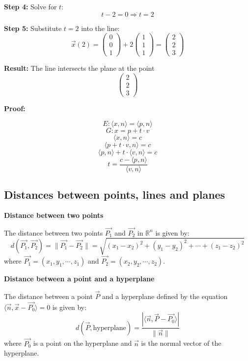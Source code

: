 \textbf{Step 4:} Solve for \( t \):
\[
	t - 2 = 0 \Rightarrow t = 2
\]

\textbf{Step 5:} Substitute \( t = 2 \) into the line:
\[
	\vec{x}(2) = \begin{pmatrix} 0 \\ 0 \\ 1 \end{pmatrix} + 2 \begin{pmatrix} 1 \\ 1 \\ 1 \end{pmatrix} =
	\begin{pmatrix} 2 \\ 2 \\ 3 \end{pmatrix}
\]

\textbf{Result:} The line intersects the plane at the point
\[
	\boxed{\begin{pmatrix} 2 \\ 2 \\ 3 \end{pmatrix}}
\]

\textbf{Proof:}

\[
	E: \langle x, n\rangle = \langle p, n \rangle
\]
\[
	G: x = p + t \cdot v
\]
\[
	\langle x, n \rangle = c
\]
\[
	\langle p + t \cdot v, n \rangle = c
\]
\[
	\langle p, n \rangle + t \cdot \langle v, n \rangle = c
\]
\[
	t = \frac{c - \langle p, n \rangle}{\langle v, n \rangle}
\]
\QED

\subsection{Distances between points, lines and planes}

\textbf{Distance between two points}

The distance between two points \(\vec{P_1}\) and \(\vec{P_2}\) in \(\mathbb{R}^n\) is given by:
\[
	d(\vec{P_1}, \vec{P_2}) = \|\vec{P_1} - \vec{P_2}\| = \sqrt{(x_1 - x_2)^2 + (y_1 - y_2)^2 + \cdots + (z_1 - z_2)^2}
\]
where \(\vec{P_1} = (x_1, y_1, \cdots,z_1)\) and \(\vec{P_2} = (x_2, y_2, \cdots,z_2)\).

\textbf{Distance between a point and a hyperplane}

The distance between a point \(\vec{P}\) and a hyperplane defined by the equation \(\langle \vec{n}, \vec{x} - \vec{P_0} \rangle = 0\) is given by:
\[
	d(\vec{P}, \text{hyperplane}) = \frac{|\langle \vec{n}, \vec{P} - \vec{P_0} \rangle|}{\|\vec{n}\|}
\]
where \(\vec{P_0}\) is a point on the hyperplane and \(\vec{n}\) is the normal vector of the hyperplane.

